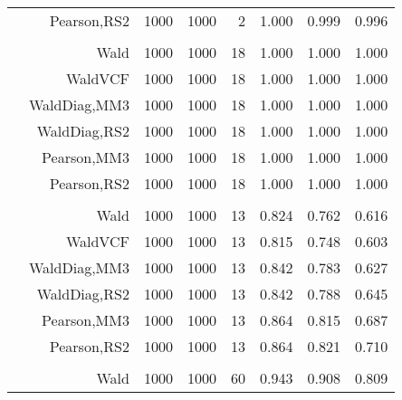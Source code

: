 \documentclass[
]{article}
\begin{document}
\begin{table}[H]
{\begin{tabular}[t]{lrrrrrrr}
\hspace{1em} & Pearson,RS2 & 1000 & 1000 & 2 & 1.000 & 0.999 & 0.996\\
\cmidrule{1-8}
\addlinespace[0.3em]
\multicolumn{8}{l}{\textbf{1F 15V}}\\
\hspace{1em} & Wald & 1000 & 1000 & 18 & 1.000 & 1.000 & 1.000\\

\hspace{1em} & WaldVCF & 1000 & 1000 & 18 & 1.000 & 1.000 & 1.000\\

\hspace{1em} & WaldDiag,MM3 & 1000 & 1000 & 18 & 1.000 & 1.000 & 1.000\\

\hspace{1em} & WaldDiag,RS2 & 1000 & 1000 & 18 & 1.000 & 1.000 & 1.000\\

\hspace{1em} & Pearson,MM3 & 1000 & 1000 & 18 & 1.000 & 1.000 & 1.000\\

\hspace{1em} & Pearson,RS2 & 1000 & 1000 & 18 & 1.000 & 1.000 & 1.000\\
\cmidrule{1-8}
\addlinespace[0.3em]
\multicolumn{8}{l}{\textbf{2F 10V}}\\
\hspace{1em} & Wald & 1000 & 1000 & 13 & 0.824 & 0.762 & 0.616\\

\hspace{1em} & WaldVCF & 1000 & 1000 & 13 & 0.815 & 0.748 & 0.603\\

\hspace{1em} & WaldDiag,MM3 & 1000 & 1000 & 13 & 0.842 & 0.783 & 0.627\\

\hspace{1em} & WaldDiag,RS2 & 1000 & 1000 & 13 & 0.842 & 0.788 & 0.645\\

\hspace{1em} & Pearson,MM3 & 1000 & 1000 & 13 & 0.864 & 0.815 & 0.687\\

\hspace{1em} & Pearson,RS2 & 1000 & 1000 & 13 & 0.864 & 0.821 & 0.710\\
\cmidrule{1-8}
\addlinespace[0.3em]
\multicolumn{8}{l}{\textbf{3F 15V}}\\
\hspace{1em} & Wald & 1000 & 1000 & 60 & 0.943 & 0.908 & 0.809\\


\end{tabular}}
\end{table}
\end{document}
